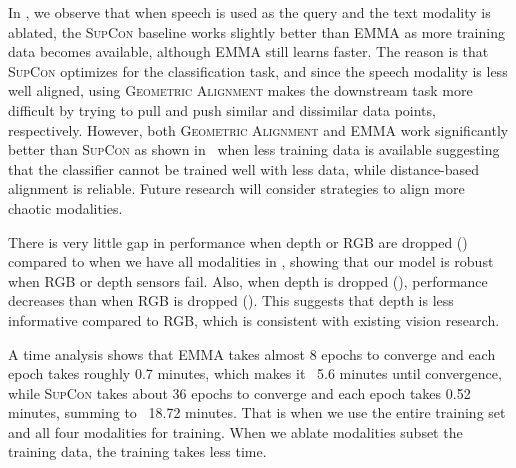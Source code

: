\documentclass[sigconf,natbib=true,anonymous=true]{acmart}
\newcommand{\todocmi}[1]{\todo[inline,color=green!40]{\small #1 -- Cynthia}}
\newcommand{\ours}{\textsc{EMMA}}
\newcommand{\geom}{\textsc{Geometric Alignment}}
\newcommand{\supcon}{\textsc{SupCon}}
\begin{document}
In , we observe that when speech is used as the query and the text modality is ablated, the \supcon{} baseline works slightly better than \ours{} as more training data becomes available, although \ours{} still learns faster. The reason is that \supcon{} optimizes for the classification task, and since the speech modality is less well aligned, using \geom{} makes the downstream task more difficult by trying to pull and push similar and dissimilar data points, respectively. However, both \geom{} and \ours{} work significantly better than \supcon{} as shown in~ when less training data is available suggesting that the classifier cannot be trained well with less data, while distance-based alignment is reliable. Future research will consider strategies to align more chaotic modalities.

There is very little gap in performance when depth or RGB are dropped () compared to when we have all modalities in , showing that our model is robust when RGB or depth sensors fail. Also, when depth is dropped (), performance decreases than when RGB is dropped (). This suggests that depth is less informative compared to RGB, which is consistent with existing vision research. 


A time analysis shows that \ours{} takes almost 8 epochs to converge and each epoch takes roughly 0.7 minutes, which makes it ~5.6 minutes until convergence, while \supcon{} takes about 36 epochs to converge and each epoch takes 0.52 minutes, summing to ~18.72 minutes. That is when we use the entire training set and all four modalities for training. When we ablate modalities subset the training data, the training takes less time.
\end{document}
